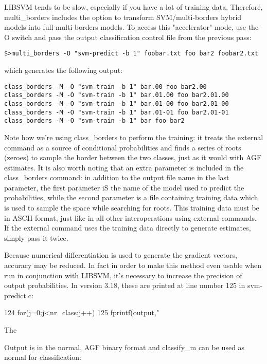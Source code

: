 \documentclass[12pt]{article}
\begin{document}
\begin{list}
LIBSVM tends to be slow, especially if you have a lot of training data.  Therefore, multi_borders includes the option to transform SVM/multi-borders hybrid models into full multi-borders models.  To access this "accelerator" mode, use the -O switch and pass the output classification control file from the previous pass:

\begin{verbatim}
$>multi_borders -O "svm-predict -b 1" foobar.txt foo bar2 foobar2.txt
\end{verbatim}

which generates the following output:

\begin{verbatim}
class_borders -M -O "svm-train -b 1" bar.00 foo bar2.00
class_borders -M -O "svm-train -b 1" bar.01.00 foo bar2.01.00
class_borders -M -O "svm-train -b 1" bar.01-00 foo bar2.01-00
class_borders -M -O "svm-train -b 1" bar.01-01 foo bar2.01-01
class_borders -M -O "svm-train -b 1" bar foo bar2
\end{verbatim}

Note how we're using class_borders to perform the training: it treats the external command as a source of conditional probabilities and finds a series of roots (zeroes) to sample the border between the two classes, just as it would with AGF estimates.  It is also worth noting that an extra parameter is included in the class_borders command: in addition to the output file name in the last parameter, the first parameter iS the name of the model used to predict the probabilities, while the second parameter is a file containing training data which is used to sample the space while searching for roots.  This training data must be in ASCII format, just like in all other interoperations using external commands.  If the external command uses the training data directly to generate estimates, simply pass it twice.

Because numerical differentiation is used to generate the gradient vectors, accuracy may be reduced.  In fact in order to make this method even usable when run in conjunction with LIBSVM, it's necessary to increase the precision of output probabilities.  In version 3.18, these are printed at line number 125 in svm-predict.c:

124		for(j=0;j<nr_class;j++)
125			fprintf(output," %

The %

Output is in the normal, AGF binary format and classify_m can be used as normal for classification:


\end{list}
\end{document}
